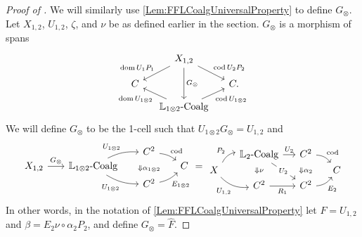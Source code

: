 \begin{proof}[Proof of ]
	We will similarly use \cref{Lem:FFLCoalgUniversalProperty} to define $G_{\otimes}$. Let $X_{1,2}$, $U_{1,2}$, $\zeta$, and $\nu$ be as defined earlier in the section. $G_{\otimes}$ is a morphism of spans
	\[
	\begin{tikzcd}[row sep=small,column sep=small]
		{} & X_{1,2} \dlar[swap]{\dom U_1P_1} \drar{\cod U_2P_2} \ar{dd}{G_{\otimes}} & \\
		C && C. \\
		& \LCoalg[1\otimes2] \ular{\dom U_{1\otimes 2}} \urar[swap]{\cod U_{1\otimes 2}}
	\end{tikzcd}
	\]
	We will define $G_{\otimes}$ to be the 1-cell such that $U_{1\otimes 2}G_{\otimes}=U_{1,2}$ and
	\[
	\begin{tikzcd}[row sep=0ex, column sep=4ex, bend angle=15, baseline=(B.base)]
		{} && |[alias=domA]| C^2 \drar[bend left][]{\cod} & \\
		|[alias=B]| X_{1,2} \rar{G_{\otimes}} 
			& \LCoalg[1\otimes2] \urar[bend left][]{U_{1\otimes2}} \drar[bend right][swap]{U_{1\otimes2}} 
			&& C \\
		&& |[alias=codA]| C^2 \urar[bend right][swap]{E_{1\otimes2}}
		\twocellA{\alpha_{1\otimes2}}
	\end{tikzcd}
	=
	\begin{tikzcd}[bend angle=25, row sep=0ex, column sep=3ex]
		& |[alias=domA]| \LCoalg[2] \rar{U_2} \ar{ddr}[description]{U_2}
			& |[alias=domB]| C^2 \drar[bend left][]{\cod} & \\
		X \urar[bend left][]{P_2} \drar[bend right][swap]{U_{1,2}}
			&&& C \\
		& |[alias=codA]| C^2 \rar[swap]{R_1}
			& |[alias=codB]| C^2 \urar[bend right][swap]{E_2} &
		\twocellA{\nu}
		\twocellB{\alpha_2}
	\end{tikzcd}
	\]
	In other words, in the notation of \cref{Lem:FFLCoalgUniversalProperty} let $F=U_{1,2}$ and $\beta=E_2\nu\circ\alpha_2P_2$, and define $G_{\otimes}=\hat{F}$.


\end{proof}
